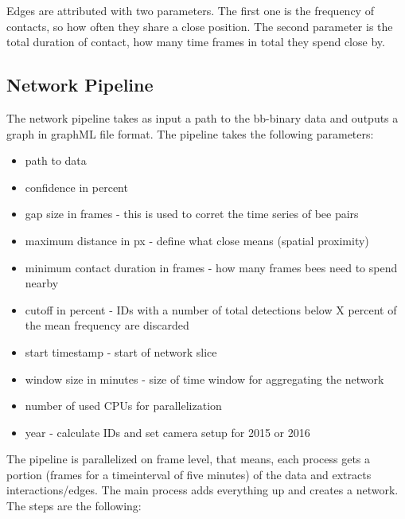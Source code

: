 Edges are attributed with two parameters. The first one is the frequency of contacts, so how often they share a close position. The second parameter is the total duration of contact, how many time frames in total they spend close by.

\subsection{Network Pipeline}

The network pipeline takes as input a path to the bb-binary data and outputs a graph in graphML file format. The pipeline takes the following parameters:

\begin{itemize}
\item path to data
\item confidence in percent
\item gap size in frames - this is used to corret the time series of bee pairs
\item maximum distance in px - define what close means (spatial proximity)
\item minimum contact duration in frames - how many frames bees need to spend nearby
\item cutoff in percent - IDs with a number of total detections below X percent of the mean frequency are discarded 
\item start timestamp - start of network slice
\item window size in minutes - size of time window for aggregating the network
\item number of used CPUs for parallelization
\item year - calculate IDs and set camera setup for 2015 or 2016
\end{itemize}

The pipeline is parallelized on frame level, that means, each process gets a portion (frames for a timeinterval of five minutes) of the data and extracts interactions/edges. The main process adds everything up and creates a network.
The steps are the following:

